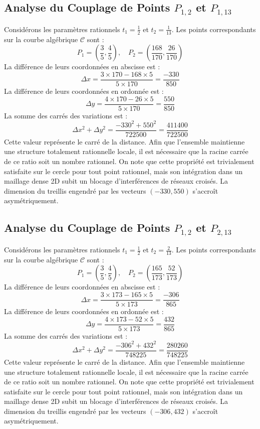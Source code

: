 \documentclass[12pt, a4paper]{article}
\begin{document}
\subsection{Analyse du Couplage de Points $P_{1,2}$ et $P_{1,13}$}
Considérons les paramètres rationnels $t_1 = \frac{1}{2}$ et $t_2 = \frac{1}{13}$.
Les points correspondants sur la courbe algébrique $\mathcal{C}$ sont :
$$ P_1 = \left( \frac{3}{5}, \frac{4}{5} \right), \quad P_2 = \left( \frac{168}{170}, \frac{26}{170} \right) $$
La différence de leurs coordonnées en abscisse est :
$$ \Delta x = \frac{3 \times 170 - 168 \times 5}{5 \times 170} = \frac{-330}{850} $$
La différence de leurs coordonnées en ordonnée est :
$$ \Delta y = \frac{4 \times 170 - 26 \times 5}{5 \times 170} = \frac{550}{850} $$
La somme des carrés des variations est :
$$ \Delta x^2 + \Delta y^2 = \frac{ -330^2 + 550^2 }{ 722500 } = \frac{ 411400 }{ 722500 } $$
Cette valeur représente le carré de la distance. Afin que l'ensemble maintienne une structure totalement rationnelle locale, il est nécessaire que la racine carrée de ce ratio soit un nombre rationnel. On note que cette propriété est trivialement satisfaite sur le cercle pour tout point rationnel, mais son intégration dans un maillage dense 2D subit un blocage d'interférences de réseaux croisés. La dimension du treillis engendré par les vecteurs $( -330, 550 )$ s'accroît asymétriquement.


\subsection{Analyse du Couplage de Points $P_{1,2}$ et $P_{2,13}$}
Considérons les paramètres rationnels $t_1 = \frac{1}{2}$ et $t_2 = \frac{2}{13}$.
Les points correspondants sur la courbe algébrique $\mathcal{C}$ sont :
$$ P_1 = \left( \frac{3}{5}, \frac{4}{5} \right), \quad P_2 = \left( \frac{165}{173}, \frac{52}{173} \right) $$
La différence de leurs coordonnées en abscisse est :
$$ \Delta x = \frac{3 \times 173 - 165 \times 5}{5 \times 173} = \frac{-306}{865} $$
La différence de leurs coordonnées en ordonnée est :
$$ \Delta y = \frac{4 \times 173 - 52 \times 5}{5 \times 173} = \frac{432}{865} $$
La somme des carrés des variations est :
$$ \Delta x^2 + \Delta y^2 = \frac{ -306^2 + 432^2 }{ 748225 } = \frac{ 280260 }{ 748225 } $$
Cette valeur représente le carré de la distance. Afin que l'ensemble maintienne une structure totalement rationnelle locale, il est nécessaire que la racine carrée de ce ratio soit un nombre rationnel. On note que cette propriété est trivialement satisfaite sur le cercle pour tout point rationnel, mais son intégration dans un maillage dense 2D subit un blocage d'interférences de réseaux croisés. La dimension du treillis engendré par les vecteurs $( -306, 432 )$ s'accroît asymétriquement.
\end{document}
